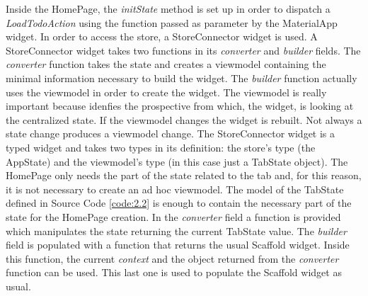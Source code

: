 Inside the HomePage, the \textit{initState} method is set up in order to dispatch a \textit{LoadTodoAction} using the function passed as parameter by the MaterialApp widget. In order to access the store, a StoreConnector widget is used. A StoreConnector widget takes two functions in its \textit{converter }and \textit{builder }fields. The \textit{converter} function takes the state and creates a viewmodel containing the minimal information necessary to build the widget. The \textit{builder} function actually uses the viewmodel in order to create the widget. The viewmodel is really important because idenfies the prospective from which, the widget, is looking at the centralized state. If the viewmodel changes the widget is rebuilt. Not always a state change produces a viewmodel change. The StoreConnector widget is a typed widget and takes two types in its definition: the store's type (the AppState) and the viewmodel's type (in this case just a TabState object). The HomePage only needs the part of the state related to the tab and, for this reason, it is not necessary to create an ad hoc viewmodel. The model of the TabState defined in Source Code \ref{code:2.2} is enough to contain the necessary part of the state for the HomePage creation. In the \textit{converter }field a function is provided which manipulates the state returning the current TabState value. The \textit{builder} field is populated with a function that returns the usual Scaffold widget. Inside this function, the current \textit{context} and the object returned from the \textit{converter} function can be used. This last one is used to populate the Scaffold widget as usual.
